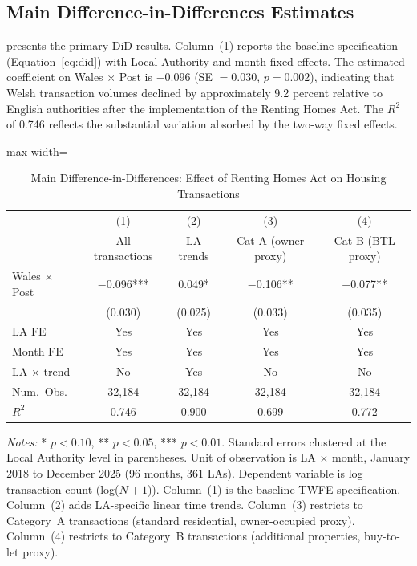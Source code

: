 \documentclass[12pt]{article}
\begin{document}
\subsection{Main Difference-in-Differences Estimates}

 presents the primary DiD results. Column~(1) reports the baseline specification (Equation~\ref{eq:did}) with Local Authority and month fixed effects. The estimated coefficient on Wales $\times$ Post is $-0.096$ (SE $= 0.030$, $p = 0.002$), indicating that Welsh transaction volumes declined by approximately 9.2 percent relative to English authorities after the implementation of the Renting Homes Act. The $R^2$ of 0.746 reflects the substantial variation absorbed by the two-way fixed effects.

\begin{table}[H]
\centering
\caption{Main Difference-in-Differences: Effect of Renting Homes Act on Housing Transactions}
\label{tab:main_did}
\begin{threeparttable}
\begin{adjustbox}{max width=\textwidth}
\begin{tabular}{lcccc}
\toprule
& (1) & (2) & (3) & (4) \\
& All transactions & LA trends & Cat A (owner proxy) & Cat B (BTL proxy) \\
\midrule
Wales $\times$ Post & $-$0.096*** & 0.049* & $-$0.106** & $-$0.077** \\
& (0.030) & (0.025) & (0.033) & (0.035) \\[6pt]
LA FE & Yes & Yes & Yes & Yes \\
Month FE & Yes & Yes & Yes & Yes \\
LA $\times$ trend & No & Yes & No & No \\[4pt]
Num.\ Obs. & 32,184 & 32,184 & 32,184 & 32,184 \\
$R^2$ & 0.746 & 0.900 & 0.699 & 0.772 \\
\bottomrule
\end{tabular}
\end{adjustbox}
\begin{tablenotes}[flushleft]
\small
\item \textit{Notes:} * $p<0.10$, ** $p<0.05$, *** $p<0.01$. Standard errors clustered at the Local Authority level in parentheses. Unit of observation is LA $\times$ month, January 2018 to December 2025 (96 months, 361 LAs). Dependent variable is log transaction count (log($N + 1$)). Column~(1) is the baseline TWFE specification. Column~(2) adds LA-specific linear time trends. Column~(3) restricts to Category~A transactions (standard residential, owner-occupied proxy). Column~(4) restricts to Category~B transactions (additional properties, buy-to-let proxy).
\end{tablenotes}
\end{threeparttable}
\end{table}
\end{document}
